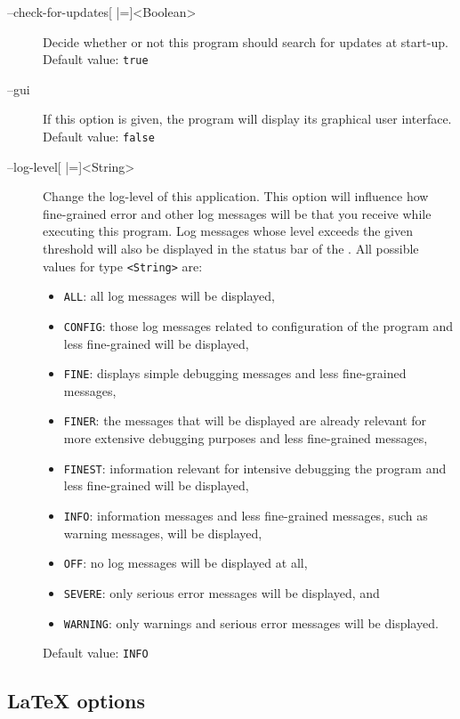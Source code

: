 \begin{description}
\item[--check-for-updates{[} |={]}<Boolean>]
  Decide whether or not this program should search for updates
  at start-up.
  Default value: \texttt{true}

\item[--gui] If this option is given, the program will display its graphical
  user interface.
  Default value: \texttt{false}

\item[--log-level{[} |={]}<String>]
  Change the log-level of this application. This option will influence how
  fine-grained error and other log messages will be that you receive while
  executing this program.
  Log messages whose level exceeds the given threshold will also be displayed in the status bar of the \GUI.
  All possible values for type \texttt{<String>} are:
  \begin{itemize}
  \item \texttt{ALL}: all log messages will be displayed,
  \item \texttt{CONFIG}: those log messages related to configuration of the program and less fine-grained will be displayed,
  \item \texttt{FINE}:  displays simple debugging messages and less fine-grained messages,
  \item \texttt{FINER}: the messages that will be displayed are already relevant for more extensive debugging purposes and less fine-grained messages,
  \item \texttt{FINEST}: information relevant for intensive debugging the program and less fine-grained will be displayed,
  \item \texttt{INFO}: information messages and less fine-grained messages, such as warning messages, will be displayed,
  \item \texttt{OFF}: no log messages will be displayed at all,
  \item \texttt{SEVERE}: only serious error messages will be displayed, and
  \item \texttt{WARNING}: only warnings and serious error messages will be displayed.
  \end{itemize}
  Default value: \texttt{INFO}
\end{description}

\subsection{\LaTeX{} options}
\label{sec:LaTeX_Options}

